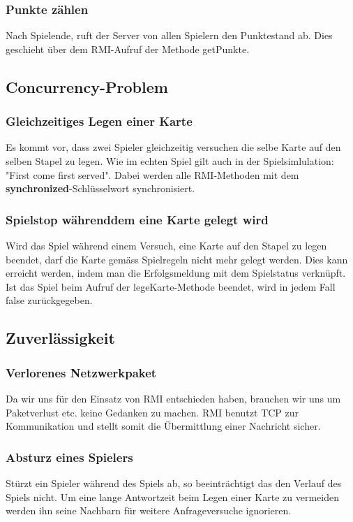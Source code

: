 \subsubsection{Punkte zählen}
Nach Spielende, ruft der Server von allen Spielern den Punktestand ab. Dies geschieht über dem RMI-Aufruf der Methode getPunkte.


\subsection{Concurrency-Problem}

\subsubsection{Gleichzeitiges Legen einer Karte}
Es kommt vor, dass zwei Spieler gleichzeitig versuchen die selbe Karte auf den selben Stapel zu legen. Wie im echten Spiel gilt auch in der Spielsimlulation: "First come first served". Dabei werden alle RMI-Methoden mit dem \textbf{synchronized}-Schlüsselwort synchronisiert.

\subsubsection{Spielstop währenddem eine Karte gelegt wird}
Wird das Spiel während einem Versuch, eine Karte auf den Stapel zu legen beendet, darf die Karte gemäss Spielregeln nicht mehr gelegt werden. Dies kann erreicht werden, indem man die Erfolgsmeldung mit dem Spielstatus verknüpft. Ist das Spiel beim Aufruf der legeKarte-Methode beendet, wird in jedem Fall false zurückgegeben.

\subsection{Zuverlässigkeit}

\subsubsection{Verlorenes Netzwerkpaket}
Da wir uns für den Einsatz von RMI entschieden haben, brauchen wir uns um Paketverlust etc. keine Gedanken zu machen. RMI benutzt TCP zur Kommunikation und stellt somit die Übermittlung einer Nachricht sicher.

\subsubsection{Absturz eines Spielers}
Stürzt ein Spieler während des Spiels ab, so beeinträchtigt das den Verlauf des Spiels nicht. Um eine lange Antwortzeit beim Legen einer Karte zu vermeiden werden ihn seine Nachbarn für weitere Anfrageversuche ignorieren.

